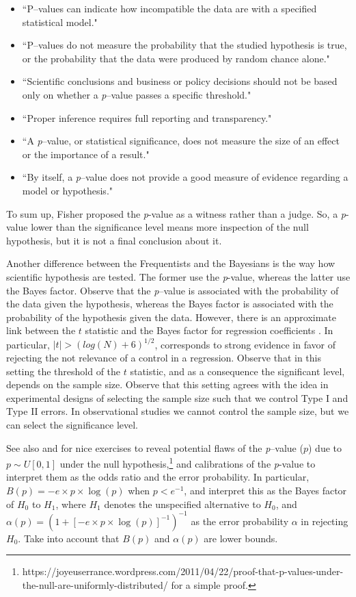 \begin{itemize}
	\item ``P--values can indicate how incompatible the data are with a specified statistical model." 
	\item ``P--values do not measure the probability that the studied hypothesis is true, or the probability that the data were produced by random chance alone."
	\item ``Scientific conclusions and business or policy decisions should not be based only on whether a \textit{p}--value passes a specific threshold."
	\item ``Proper inference requires full reporting and transparency."
	\item ``A \textit{p}--value, or statistical significance, does not measure the size of an effect or the importance of a result."
	\item ``By itself, a \textit{p}--value does not provide a good measure of evidence regarding a model or hypothesis." 
\end{itemize}

To sum up, Fisher proposed the \textit{p}-value as a witness rather than a judge. So, a \textit{p}-value lower than the significance level means more inspection of the null hypothesis, but it is not a final conclusion about it. 

Another difference between the Frequentists and the Bayesians is the way how scientific hypothesis are tested. The former use the \textit{p}-value, whereas the latter use the Bayes factor. Observe that the \textit{p}--value is associated with the probability of the data given the hypothesis, whereas the Bayes factor is associated with the probability of the hypothesis given the data. However, there is an approximate link between the $t$ statistic and the Bayes factor for regression coefficients \cite{Raftery1995}. In particular, $|t|>(log(N)+6)^{1/2}$, corresponds to strong evidence in favor of rejecting the not relevance of a control in a regression. Observe that in this setting the threshold of the $t$ statistic, and as a consequence the significant level, depends on the sample size. Observe that this setting agrees with the idea in experimental designs of selecting the sample size such that we control Type I and Type II errors. In observational studies we cannot control the sample size, but we can select the significance level.

See also \cite{sellke2001calibration} and \cite{benjamin2018redefine} for nice exercises to reveal potential flaws of the \textit{p}--value ($p$) due to $p\sim U[0,1]$ under the null hypothesis,\footnote{https://joyeuserrance.wordpress.com/2011/04/22/proof-that-p-values-under-the-null-are-uniformly-distributed/ for a simple proof.} and calibrations of the \textit{p}-value to interpret them as the odds ratio and the error probability. In particular, $B(p)=-e\times p\times\log(p)$ when $p<e^{-1}$, and interpret this as the Bayes factor of $H_0$ to $H_1$, where $H_1$ denotes the unspecified alternative to $H_0$, and $\alpha(p)=(1+[-e\times p\times \log(p)]^{-1})^{-1}$ as the error probability $\alpha$ in rejecting $H_0$. Take into account that $B(p)$ and $\alpha(p)$ are lower bounds.

